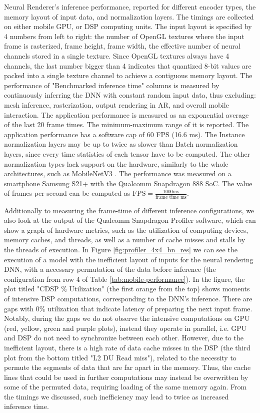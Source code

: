\begin{table}[!htbp]
	\caption{Neural Renderer's inference performance, reported for different encoder types, the memory layout of input data, and normalization layers. The timings are collected on either mobile GPU, or DSP computing units. The input layout is specified by 4 numbers from left to right: the number of OpenGL textures where the input frame is rasterized, frame height, frame width, the effective number of neural channels stored in a single texture. Since OpenGL textures always have 4 channels, the last number bigger than 4 indicates that quantized 8-bit values are packed into a single texture channel to achieve a contiguous memory layout. The performance of "Benchmarked inference time" columns is measured by continuously inferring the DNN with constant random input data, thus excluding: mesh inference, rasterization, output rendering in AR, and overall mobile interaction. The application performance is measured as an exponential average of the last 20 frame times. The minimum-maximum range of it is reported. The application performance has a software cap of 60 FPS (16.6 ms). The Instance normalization layers may be up to twice as slower than Batch normalization layers, since every time statistics of each tensor have to be computed. The other normalization types lack support on the hardware, similarly to the whole architectures, such as MobileNetV3 \cite{dnn:mnv3-19}. The performance was measured on a smartphone Samsung S21+ with the Qualcomm Snapdragon 888 SoC. The value of frames-per-second can be computed as $\text{FPS} = \tfrac{1000\text{ms}}{\text{frame time ms}}$.}	
	\label{tab:mobile-performance}		
\end{table} 

Additionally to measuring the frame-time of different inference configurations, we also look at the output of the Qualcomm Snapdragon Profiler software, which can show a graph of hardware metrics, such as the utilization of computing devices, memory caches, and threads, as well as a number of cache misses and stalls by the threads of execution. In Figure \ref{fig:profiler_4x4_bn_res} we can see the execution of a model with the inefficient layout of inputs for the neural rendering DNN, with a necessary permutation of the data before inference (the configuration from row 4 of Table \ref{tab:mobile-performance}). In the figure, the plot titled "CDSP \% Utilization" (the first orange from the top) shows moments of intensive DSP computations, corresponding to the DNN's inference. There are gaps with 0\% utilization that indicate latency of preparing the next input frame. Notably, during the gaps we do not observe the intensive computations on GPU (red, yellow, green and purple plots), instead they operate in parallel, i.e. GPU and DSP do not need to synchronize between each other. However, due to the inefficient layout, there is a high rate of data cache misses in the DSP (the third plot from the bottom titled "L2 DU Read miss"), related to the necessity to permute the segments of data that are far apart in the memory. Thus, the cache lines that could be used in further computations may instead be overwritten by some of the permuted data, requiring loading of the same memory again. From the timings we discussed, such inefficiency may lead to twice as increased inference time.

